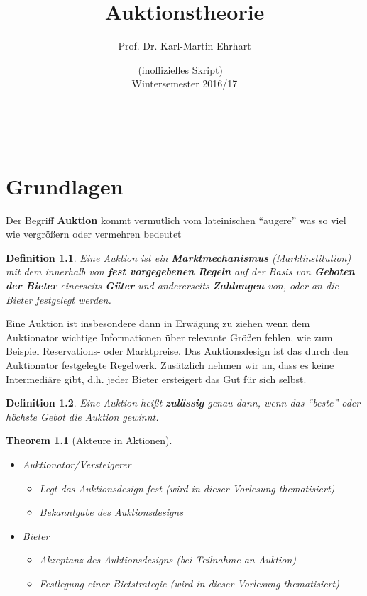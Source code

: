 \documentclass[12pt]{extreport} %
\title{Auktionstheorie}
\author{Prof. Dr. Karl-Martin Ehrhart}
\date{(inoffizielles Skript) ~\vspace{0.2cm} \\ Wintersemester 2016/17}
\makeatletter
\theoremstyle{named}
\theoremstyle{nnamed}
\newtheorem*{unnamedtheorem*}{Theorem}
\theoremstyle{itshape}
\newtheorem*{definition}{Definition}
\theoremstyle{normal}
\def\maketitle{ \begin{titlepage} 
			~\vspace{3cm} 
		\begin{center} {\Huge \@title} \end{center} 
	 		\vspace*{1cm} 
	 	\begin{center} {\large \@author} \end{center} 
	 	\begin{center} \@date \end{center} 
	 		\vspace*{7cm} 
	 	\begin{center} \@publishers \end{center} 
	 		\vfill 
	\end{titlepage} }
\makeatother
\begin{document}
\begin{titlepage}
	\maketitle
	\thispagestyle{empty}
\end{titlepage}
	
\tableofcontents
\thispagestyle{empty} 
  
\chapter{Grundlagen}

Der Begriff \textbf{Auktion} kommt vermutlich vom lateinischen \enquote{augere} was so viel wie vergrößern oder vermehren bedeutet

\begin{definition}
	Eine Auktion ist ein \textbf{Marktmechanismus} (Marktinstitution) mit dem innerhalb von \textbf{fest vorgegebenen Regeln} auf der Basis von \textbf{Geboten der Bieter} einerseits \textbf{Güter} und andererseits \textbf{Zahlungen} von, oder an die Bieter festgelegt werden.
\end{definition}

Eine Auktion ist insbesondere dann in Erwägung zu ziehen wenn dem Auktionator wichtige Informationen über relevante Größen fehlen, wie zum Beispiel Reservations- oder Marktpreise. Das Auktionsdesign ist das durch den Auktionator festgelegte Regelwerk. Zusätzlich nehmen wir an, dass es keine Intermediäre gibt, d.h. jeder Bieter ersteigert das Gut für sich selbst.

 
\begin{definition}
	Eine Auktion heißt \textbf{zulässig} genau dann, wenn das \enquote{beste} oder höchste Gebot die Auktion gewinnt.
\end{definition}

 
\begin{unnamedtheorem*}[Akteure in Aktionen] ~\
	\begin{itemize}
		\item Auktionator/Versteigerer
			\begin{itemize}
				\item Legt das Auktionsdesign fest (wird in dieser Vorlesung thematisiert)
				\item Bekanntgabe des Auktionsdesigns
			\end{itemize}
		\item Bieter
			\begin{itemize}
				\item Akzeptanz des Auktionsdesigns (bei Teilnahme an Auktion)
				\item Festlegung einer Bietstrategie (wird in dieser Vorlesung thematisiert)
			\end{itemize}
	\end{itemize} 
\end{unnamedtheorem*}
\end{document}
